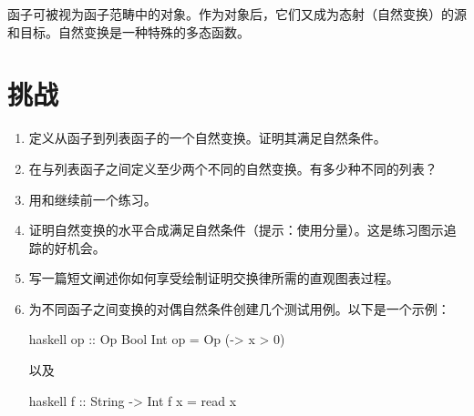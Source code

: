 函子可被视为函子范畴中的对象。作为对象后，它们又成为态射（自然变换）的源和目标。自然变换是一种特殊的多态函数。

\section{挑战}

\begin{enumerate}
  \tightlist
  \item
        定义从函子到列表函子的一个自然变换。证明其满足自然条件。
  \item
        在与列表函子之间定义至少两个不同的自然变换。有多少种不同的\code{()}列表？
  \item
        用和继续前一个练习。
  \item
        证明自然变换的水平合成满足自然条件（提示：使用分量）。这是练习图示追踪的好机会。
  \item
        写一篇短文阐述你如何享受绘制证明交换律所需的直观图表过程。
  \item
        为不同函子之间变换的对偶自然条件创建几个测试用例。以下是一个示例：

        \begin{snip}{haskell}
op :: Op Bool Int
op = Op (\x -> x > 0)
\end{snip}
        以及

        \begin{snip}{haskell}
f :: String -> Int
f x = read x
\end{snip}
\end{enumerate}